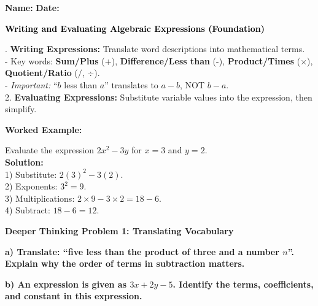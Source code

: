 \documentclass[12pt, letterpaper, fleqn]{article}
\begin{document}
\textbf{Name:} \underline{\hspace{5cm}}
\hfill
\textbf{Date:} \underline{\hspace{3cm}}\\

\begin{tcolorbox}[colback=black!10]
    \large\textcolor{black}{\textbf{Writing and Evaluating Algebraic Expressions (Foundation)}}
\end{tcolorbox}

\vspace{3mm}

. \textbf{Writing Expressions:} Translate word descriptions into mathematical terms. \\
- Key words: \textbf{Sum/Plus} (+), \textbf{Difference/Less than} (-), \textbf{Product/Times} ($\times$), \textbf{Quotient/Ratio} ($/$, $\div$). \\
- \textit{Important:} ``$b$ less than $a$'' translates to $a - b$, NOT $b - a$. \\
2. \textbf{Evaluating Expressions:} Substitute variable values into the expression, then simplify.

\vspace{4mm}

\begin{tcolorbox}[colback=white, colframe=black!25, boxrule=0.6pt, arc=4mm, left=6mm, right=6mm, top=5mm, bottom=5mm]
\textbf{Worked Example:}

\medskip
\noindent
Evaluate the expression $2x^2 - 3y$ for $x = 3$ and $y = 2$.\\
\textbf{Solution:} \\
1) Substitute: $2(3)^2 - 3(2)$. \\
2) Exponents: $3^2 = 9$. \\
3) Multiplications: $2 \times 9 - 3 \times 2 = 18 - 6$. \\
4) Subtract: $18 - 6 = 12$.
\end{tcolorbox}

\newpage

\begin{tcolorbox}[colback=black!5, colframe=black!50, boxrule=1pt, arc=4mm, left=6mm, right=6mm, top=5mm, bottom=5mm]
\textbf{Deeper Thinking Problem 1: Translating Vocabulary}

\medskip

\noindent
\textbf{a) Translate: ``five less than the product of three and a number $n$''. Explain why the order of terms in subtraction matters.}

\vspace{2cm}

\noindent
\textbf{b) An expression is given as $3x + 2y - 5$. Identify the terms, coefficients, and constant in this expression.}

\vspace{2cm}
\end{tcolorbox}
\newpage
\end{document}

